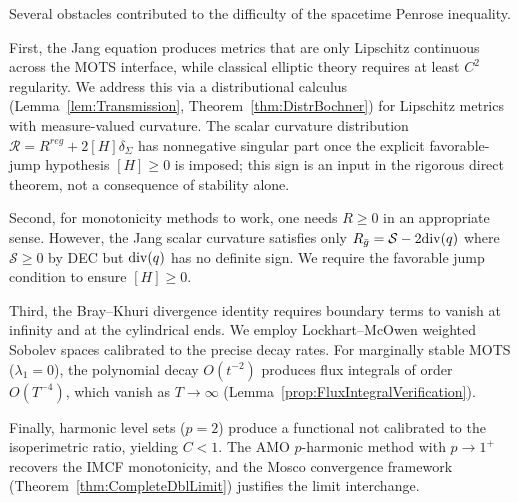 \begin{remark}\label{rem:MetaAnalysis}
Several obstacles contributed to the difficulty of the spacetime Penrose inequality.

First, the Jang equation produces metrics that are only Lipschitz continuous across the MOTS interface, while classical elliptic theory requires at least $C^2$ regularity. We address this via a distributional calculus (Lemma~\ref{lem:Transmission}, Theorem~\ref{thm:DistrBochner}) for Lipschitz metrics with measure-valued curvature. The scalar curvature distribution $\mathcal{R} = R^{reg} + 2[H]\delta_\Sigma$ has nonnegative singular part once the explicit favorable-jump hypothesis $[H] \ge 0$ is imposed; this sign is an input in the rigorous direct theorem, not a consequence of stability alone.

Second, for monotonicity methods to work, one needs $R \ge 0$ in an appropriate sense. However, the Jang scalar curvature satisfies only $R_{\bar{g}} = \mathcal{S} - 2\mathrm{div}(q)$ where $\mathcal{S} \ge 0$ by DEC but $\mathrm{div}(q)$ has no definite sign. We require the favorable jump condition to ensure $[H] \ge 0$.

Third, the Bray--Khuri divergence identity requires boundary terms to vanish at infinity and at the cylindrical ends. We employ Lockhart--McOwen weighted Sobolev spaces calibrated to the precise decay rates. For marginally stable MOTS ($\lambda_1 = 0$), the polynomial decay $O(t^{-2})$ produces flux integrals of order $O(T^{-4})$, which vanish as $T \to \infty$ (Lemma~\ref{prop:FluxIntegralVerification}).

Finally, harmonic level sets ($p = 2$) produce a functional not calibrated to the isoperimetric ratio, yielding $C < 1$. The AMO $p$-harmonic method with $p \to 1^+$ recovers the IMCF monotonicity, and the Mosco convergence framework (Theorem~\ref{thm:CompleteDblLimit}) justifies the limit interchange.
\end{remark}

